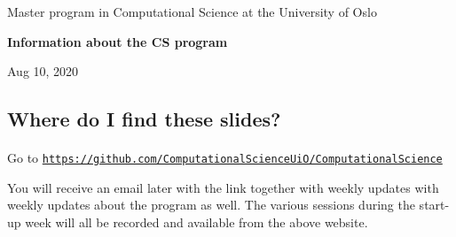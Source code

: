 \documentclass[%
oneside,                 %
final,                   %
10pt]{article}
\begin{document}

\newcommand{\exercisesection}[1]{\subsection*{#1}}






\thispagestyle{empty}

\begin{center}
{\LARGE\bf
\begin{spacing}{1.25}
Master program in Computational Science  at the University of Oslo
\end{spacing}
}
\end{center}


\begin{center}
{\bf Information about the CS program${}^{}$} \\ [0mm]
\end{center}

\begin{center}
\end{center}
    


\begin{center}
Aug 10, 2020
\end{center}

\vspace{1cm}


\subsection{Where do I find these slides?}


\paragraph{}
Go to \href{{https://github.com/ComputationalScienceUiO/ComputationalScience}}{\nolinkurl{https://github.com/ComputationalScienceUiO/ComputationalScience}}

You will receive an email later with the link together with weekly updates with weekly updates about the program as well.
The various sessions during the start-up week will all be recorded and available from the above website.
\end{document}
